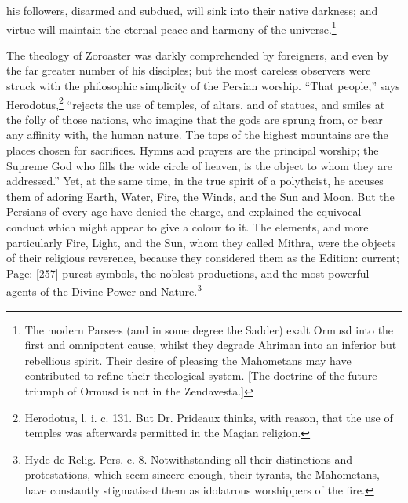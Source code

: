 his followers, disarmed and subdued, will sink into their native darkness; and virtue will maintain the eternal peace and harmony of the universe.\footnote{The modern Parsees (and in some degree the Sadder) exalt Ormusd into the first and omnipotent cause, whilst they degrade Ahriman into an inferior but rebellious spirit. Their desire of pleasing the Mahometans may have contributed to refine their theological system. [The doctrine of the future triumph of Ormusd is not in the Zendavesta.]}

The theology of Zoroaster was darkly comprehended by foreigners, and even by the far greater number of his disciples; but the most careless observers were struck with the philosophic simplicity of the Persian worship. \texthebrew{“}That people,\texthebrew{}” says Herodotus,\footnote{Herodotus, l. i. c. 131. But Dr. Prideaux thinks, with reason, that the use of temples was afterwards permitted in the Magian religion.} \texthebrew{“}rejects the use of temples, of altars, and of statues, and smiles at the folly of those nations, who imagine that the gods are sprung from, or bear any affinity with, the human nature. The tops of the highest mountains are the places chosen for sacrifices. Hymns and prayers are the principal worship; the Supreme God who fills the wide circle of heaven, is the object to whom they are addressed.\texthebrew{}” Yet, at the same time, in the true spirit of a polytheist, he accuses them of adoring Earth, Water, Fire, the Winds, and the Sun and Moon. But the Persians of every age have denied the charge, and explained the equivocal conduct which might appear to give a colour to it. The elements, and more particularly Fire, Light, and the Sun, whom they called Mithra, were the objects of their religious reverence, because they considered them as the Edition: current; Page: [257] purest symbols, the noblest productions, and the most powerful agents of the Divine Power and Nature.\footnote{Hyde de Relig. Pers. c. 8. Notwithstanding all their distinctions and protestations, which seem sincere enough, their tyrants, the Mahometans, have constantly stigmatised them as idolatrous worshippers of the fire.}

